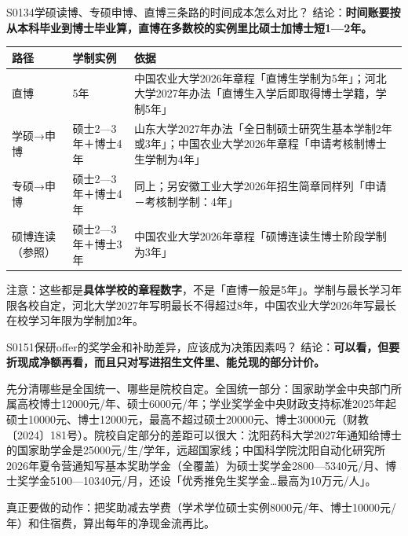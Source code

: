 \begin{qa}{S0134}{学硕读博、专硕申博、直博三条路的时间成本怎么对比？}
结论：\textbf{时间账要按从本科毕业到博士毕业算，直博在多数校的实例里比硕士加博士短1—2年。}

\par\vspace{2pt}\nobreak\begin{center}\footnotesize
\begin{tabularx}{\textwidth}{>{\raggedright\arraybackslash}X>{\raggedright\arraybackslash}X>{\raggedright\arraybackslash}X}
\toprule
\textbf{路径} & \textbf{学制实例} & \textbf{依据} \\ \midrule
直博 & 5年 & 中国农业大学2026年章程「直博生学制为5年」；河北大学2027年办法「直博生入学后即取得博士学籍，学制5年」 \\
学硕→申博 & 硕士2—3年＋博士4年 & 山东大学2027年办法「全日制硕士研究生基本学制2年或3年」；中国农业大学2026年章程「申请考核制博士生学制为4年」 \\
专硕→申博 & 硕士2—3年＋博士4年 & 同上；另安徽工业大学2026年招生简章同样列「申请－考核制学制：4年」 \\
硕博连读（参照） & 硕士2—3年＋博士3年 & 中国农业大学2026年章程「硕博连读生博士阶段学制为3年」 \\
\bottomrule
\end{tabularx}
\end{center}\vspace{2pt}\par

注意：这些都是\textbf{具体学校的章程数字}，不是「直博一般是5年」。学制与最长学习年限各校自定，河北大学2027年写明最长不得超过8年，中国农业大学2026年写最长在校学习年限为学制加2年。
\end{qa}

\begin{qa}{S0151}{保研offer的奖学金和补助差异，应该成为决策因素吗？}
结论：\textbf{可以看，但要折现成净额再看，而且只对写进招生文件里、能兑现的部分计价。}

先分清哪些是全国统一、哪些是院校自定。全国统一部分：国家助学金中央部门所属高校博士12000元/年、硕士6000元/年；学业奖学金中央财政支持标准2025年起硕士10000元、博士12000元，最高不超过硕士20000元、博士30000元（财教〔2024〕181号）。院校自定部分的差距可以很大：沈阳药科大学2027年通知给博士的国家助学金是25000元/生/学年，远超国家线；中国科学院沈阳自动化研究所2026年夏令营通知写基本奖助学金（全覆盖）为硕士奖学金2800—5340元/月、博士奖学金5100—10340元/月，还设「优秀推免生奖学金…最高为10万元/人」。

真正要做的动作：把奖助减去学费（学术学位硕士实例8000元/年、博士10000元/年）和住宿费，算出每年的净现金流再比。
\end{qa}

